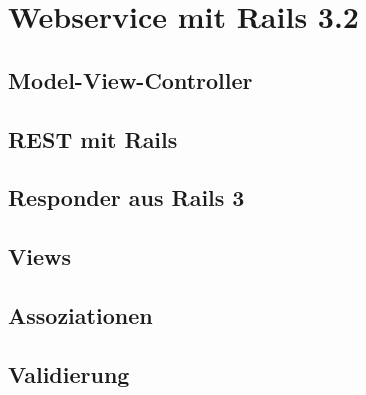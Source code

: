 \section[Webservices]{Webservice mit Rails 3.2}


\subsection{Model-View-Controller}


\subsection{REST mit Rails}


\subsection{Responder aus Rails 3}


\subsection{Views}


\subsection{Assoziationen}


\subsection{Validierung}



